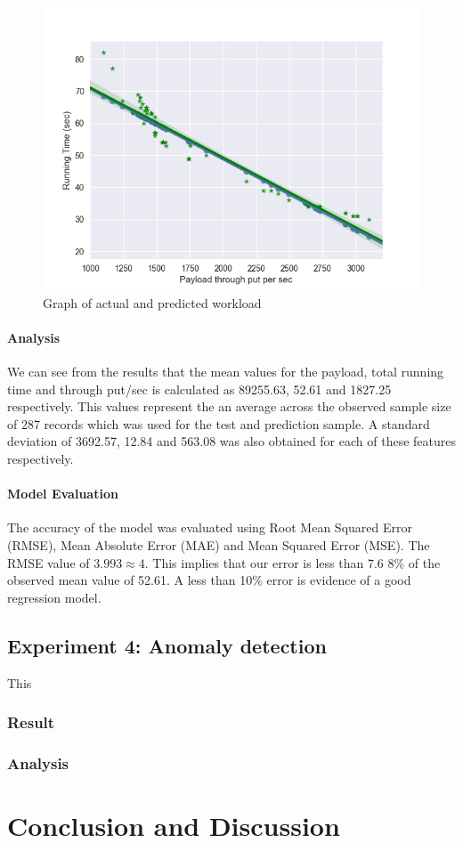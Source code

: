 \documentclass[12pt, letterpaper, titlepage]{report}
\begin{document}
\begin{figure}[h]
	\centering
	\includegraphics{workloadActualAndPredicted.png}
	\caption{Graph of actual and predicted workload}
	\label{fig_workloadPred200}
\end{figure}


\subsubsection{Analysis}
We can see from the results that the mean values for the payload, total running time and through put/sec is calculated as 89255.63, 52.61 and 1827.25 respectively. This values represent the an average across the observed sample size of 287 records which was used for the test and prediction sample. A standard deviation of 3692.57, 12.84 and 563.08 was also obtained for each of these features respectively.


\subsubsection{Model Evaluation}
The accuracy of the model was evaluated using Root Mean Squared Error (RMSE), Mean Absolute Error (MAE) and Mean Squared Error (MSE). The RMSE value of $3.993 \approx 4$. This implies that our error is less than 7.6 8\% of the observed mean value of 52.61. A less than 10\% error is evidence of a good regression model.


\section{Experiment 4: Anomaly detection}
This

\subsection{Result} 

\subsection{Analysis}


\chapter{\textbf{Conclusion and Discussion}}




\end{document}
